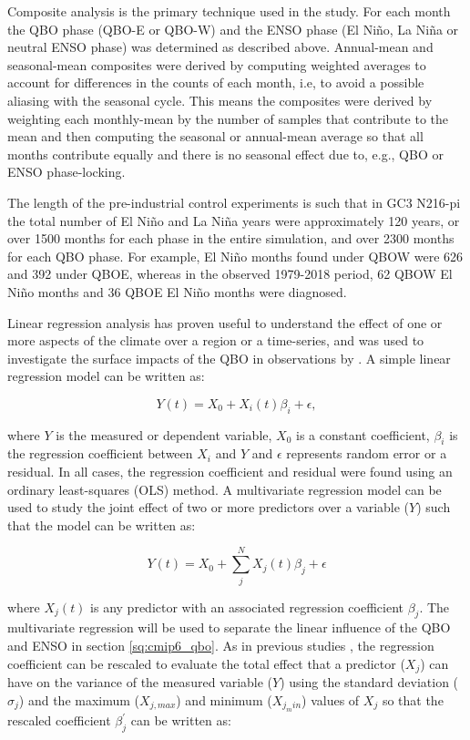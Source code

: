 Composite analysis is the primary technique used in the study. For each month the QBO phase (QBO-E or QBO-W) and the  ENSO phase (El Niño, La Niña or neutral ENSO phase) was determined as described above. Annual-mean and seasonal-mean composites were derived by computing weighted averages to account for differences in the counts of each month, i.e, to avoid a possible aliasing with the seasonal cycle. This means the composites were derived by weighting each monthly-mean by the number of samples that contribute to the mean and then computing the seasonal or annual-mean average so that all months contribute equally and there is no seasonal effect due to, e.g., QBO or ENSO phase-locking.

The length of the pre-industrial control experiments is such that in GC3 N216-pi the total number of El Niño and La Niña years were approximately 120 years, or over 1500 months for each phase in the entire simulation, and over 2300 months for each QBO phase. For example, El Niño months found under QBOW were 626 and 392 under QBOE, whereas in the observed 1979-2018 period, 62 QBOW El Niño months and 36 QBOE El Niño months were diagnosed.

Linear regression analysis has proven useful to understand the effect of one or more aspects of the climate over a region or a time-series, and was used to investigate the surface impacts of the QBO in observations by \cite{gray2018}. 
A simple linear regression model can be written as:

\begin{equation}
Y(t)=X_0+X_i(t)\beta_i + \epsilon,
\end{equation}

\noindent where $Y$ is the measured or dependent variable, $X_0$ is a constant coefficient, $\beta_i$ is the regression coefficient between $X_i$ and $Y$ and $\epsilon$ represents random error or a residual.  In all cases, the regression coefficient and residual were found using an ordinary least-squares (OLS) method.
A multivariate regression model can be used to study the joint effect of two or more predictors over a variable ($Y$) such that the model can be written as:

\begin{equation}
Y(t)=X_0+\sum_j^NX_j(t)\beta_j+\epsilon
\end{equation}

\noindent where $X_j(t)$ is any predictor with an associated regression coefficient $\beta_j$. The multivariate regression will be used to separate the linear influence of the QBO and ENSO in section \ref{sq:cmip6_qbo}.
As in previous studies \citep{gray2018,misios2019slowdown}, the regression coefficient can be rescaled to evaluate the total effect that a predictor ($X_j$) can have on the variance of the measured variable ($Y$) using the standard deviation ($\sigma_j$) and the maximum ($X_{j,max}$) and minimum ($X_{j_min}$) values of $X_j$ so that the rescaled coefficient $\beta_j^\prime$ can be written as:

